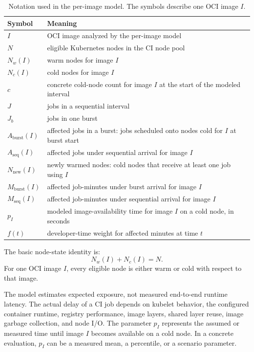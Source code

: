\documentclass[11pt,a4paper]{article}
\begin{document}
\begin{table}[H]
\centering
\renewcommand{\arraystretch}{1.12}
\caption{Notation used in the per-image model. The symbols describe one OCI image \(I\).}
\label{tab:notation}
\small
\begin{tabular}{ll}
\toprule
Symbol & Meaning \\
\midrule
\(I\) & OCI image analyzed by the per-image model \\
\(N\) & eligible Kubernetes nodes in the CI node pool \\
\(N_w(I)\) & warm nodes for image \(I\) \\
\(N_c(I)\) & cold nodes for image \(I\) \\
\(c\) & concrete cold-node count for image \(I\) at the start of the modeled interval \\
\(J\) & jobs in a sequential interval \\
\(J_b\) & jobs in one burst \\
\(A_{\mathrm{burst}}(I)\) & affected jobs in a burst: jobs scheduled onto nodes cold for \(I\) at burst start \\
\(A_{\mathrm{seq}}(I)\) & affected jobs under sequential arrival for image \(I\) \\
\(N_{\mathrm{new}}(I)\) & newly warmed nodes: cold nodes that receive at least one job using \(I\) \\
\(M_{\mathrm{burst}}(I)\) & affected job-minutes under burst arrival for image \(I\) \\
\(M_{\mathrm{seq}}(I)\) & affected job-minutes under sequential arrival for image \(I\) \\
\(p_I\) & modeled image-availability time for image \(I\) on a cold node, in seconds \\
\(f(t)\) & developer-time weight for affected minutes at time \(t\) \\
\bottomrule
\end{tabular}
\end{table}

The basic node-state identity is:
\begin{equation}
N_w(I) + N_c(I) = N.
\end{equation}
For one OCI image \(I\), every eligible node is either warm or cold with respect to that image.

The model estimates expected exposure, not measured end-to-end runtime latency. The actual delay of a CI job depends on kubelet behavior, the configured container runtime, registry performance, image layers, shared layer reuse, image garbage collection, and node I/O. The parameter \(p_I\) represents the assumed or measured time until image \(I\) becomes available on a cold node. In a concrete evaluation, \(p_I\) can be a measured mean, a percentile, or a scenario parameter.
\end{document}

